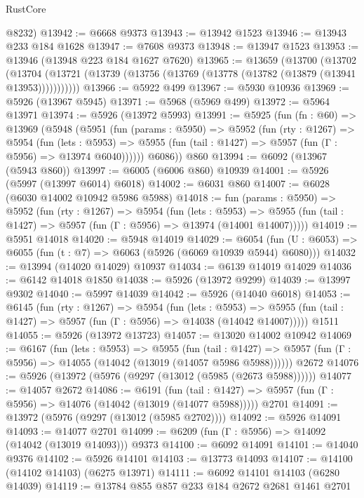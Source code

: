 \begin{lexlean}{RustCore}
\begin{coremodule}
      @8232)
@13942 := @6668 @9373
@13943 := @13942 @1523
@13946 := @13943 @233 @184 @1628
@13947 := @7608 @9373
@13948 := @13947 @1523
@13953 := @13946 (@13948 @223 @184 @1627 @7620)
@13965 := @13659
    (@13700
      (@13702
        (@13704 (@13721 (@13739 (@13756 (@13769 (@13778 (@13782 (@13879 (@13941 @13953)))))))))))
@13966 := @5922 @499
@13967 := @5930 @10936
@13969 := @5926 (@13967 @5945)
@13971 := @5968 (@5969 @499)
@13972 := @5964 @13971
@13974 := @5926 (@13972 @5993)
@13991 := @5925
    (fun (fn : @60) =>
    @13969
      (@5948
        (@5951
          (fun (params : @5950) =>
          @5952
            (fun (rty : @1267) =>
            @5954
              (fun (lets : @5953) =>
              @5955 (fun (tail : @1427) => @5957 (fun (Γ : @5956) => @13974 @6040))))))
        @6086))
    @860
@13994 := @6092 (@13967 (@5943 @860))
@13997 := @6005 (@6006 @860) @10939
@14001 := @5926 (@5997 (@13997 @6014) @6018)
@14002 := @6031 @860
@14007 := @6028 (@6030 @14002 @10942 @5986 @5988)
@14018 := fun (params : @5950) =>
  @5952
    (fun (rty : @1267) =>
    @5954
      (fun (lets : @5953) =>
      @5955 (fun (tail : @1427) => @5957 (fun (Γ : @5956) => @13974 (@14001 @14007)))))
@14019 := @5951 @14018
@14020 := @5948 @14019
@14029 := @6054
    (fun (U : @6053) => @6055 (fun (t : @7) => @6063 (@5926 (@6069 @10939 @5944) @6080)))
@14032 := @13994 (@14020 @14029) @10937
@14034 := @6139 @14019 @14029
@14036 := @6142 @14018 @1850
@14038 := @5926 (@13972 @9299)
@14039 := @13997 @9302
@14040 := @5997 @14039
@14042 := @5926 (@14040 @6018)
@14053 := @6145
    (fun (rty : @1267) =>
    @5954
      (fun (lets : @5953) =>
      @5955 (fun (tail : @1427) => @5957 (fun (Γ : @5956) => @14038 (@14042 @14007)))))
    @1511
@14055 := @5926 (@13972 @13723)
@14057 := @13020 @14002 @10942
@14069 := @6167
    (fun (lets : @5953) =>
    @5955
      (fun (tail : @1427) =>
      @5957 (fun (Γ : @5956) => @14055 (@14042 (@13019 (@14057 @5986 @5988))))))
    @2672
@14076 := @5926 (@13972 (@5976 (@9297 (@13012 (@5985 (@2673 @5988))))))
@14077 := @14057 @2672
@14086 := @6191
    (fun (tail : @1427) => @5957 (fun (Γ : @5956) => @14076 (@14042 (@13019 (@14077 @5988)))))
    @2701
@14091 := @13972 (@5976 (@9297 (@13012 (@5985 @2702))))
@14092 := @5926 @14091
@14093 := @14077 @2701
@14099 := @6209 (fun (Γ : @5956) => @14092 (@14042 (@13019 @14093))) @9373
@14100 := @6092 @14091
@14101 := @14040 @9376
@14102 := @5926 @14101
@14103 := @13773 @14093
@14107 := @14100 (@14102 @14103) (@6275 @13971)
@14111 := @6092 @14101 @14103 (@6280 @14039)
@14119 := @13784 @855 @857 @233 @184 @2672 @2681 @1461 @2701

\end{coremodule}
\end{lexlean}
